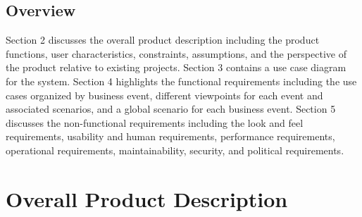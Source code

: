\documentclass[]{article}
\begin{document}
\subsection{Overview}
\label{sub:overview}
Section 2 discusses the overall product description including the product functions, user 
characteristics, constraints, assumptions, and the perspective of the product relative to 
existing projects. Section 3 contains a use case diagram for the system. Section 4 highlights 
the functional requirements including the use cases organized by business event, different 
viewpoints for each event and associated scenarios, and a global scenario for each business 
event. Section 5 discusses the non-functional requirements including the look and feel 
requirements, usability and human requirements, performance requirements, operational 
requirements, maintainability, security, and political requirements.


\newpage
\section{Overall Product Description}
\label{sec:overall_description}
\end{document}
